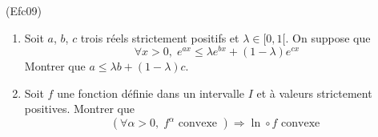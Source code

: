 \begin{tiny}(Efc09)\end{tiny}
\begin{enumerate}
 \item Soit $a$, $b$, $c$ trois réels strictement positifs et $\lambda\in [0,1[$. On suppose que 
\begin{displaymath}
 \forall x>0,\;e^{ax}\leq \lambda e^{bx}+(1-\lambda) e^{cx}
\end{displaymath}
Montrer que $a\leq \lambda b + (1-\lambda)c$.
\item Soit $f$ une fonction définie dans un intervalle $I$ et à valeurs strictement positives. Montrer que
\begin{displaymath}
 \left( \forall \alpha >0, \; f^\alpha \text{ convexe }\right) 
\Rightarrow \ln \circ f  \text{ convexe }
\end{displaymath}

\end{enumerate}
